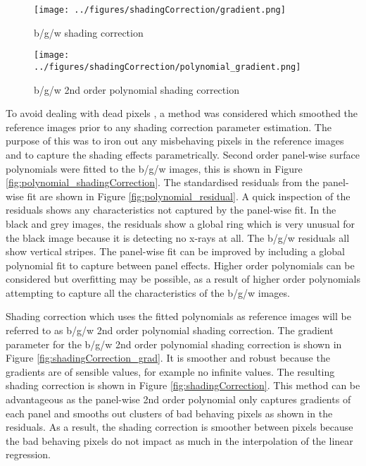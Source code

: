 \documentclass[a4paper]{proc}
\begin{document}
\begin{figure*}
	\centering
	\begin{subfigure}{0.45\textwidth}
		\texttt{[image: ../figures/shadingCorrection/gradient.png]}
		\caption{b/g/w shading correction}
	\end{subfigure}
	\begin{subfigure}{0.45\textwidth}
		\texttt{[image: ../figures/shadingCorrection/polynomial\_gradient.png]}
		\caption{b/g/w 2nd order polynomial shading correction}
	\end{subfigure}
	\caption{The gradient used in b/g/w shading correction. Red circles indicate infinite gradient, green circles indicate negative gradient.}
	\label{fig:shadingCorrection_grad}
\end{figure*}

To avoid dealing with dead pixels \cite{brettschneider2014spatial}, a method was considered which smoothed the reference images prior to any shading correction parameter estimation. The purpose of this was to iron out any misbehaving pixels in the reference images and to capture the shading effects parametrically. Second order panel-wise surface polynomials were fitted to the b/g/w images, this is shown in Figure \ref{fig:polynomial_shadingCorrection}. The standardised residuals from the panel-wise fit are shown in Figure \ref{fig:polynomial_residual}. A quick inspection of the residuals shows any characteristics not captured by the panel-wise fit. In the black and grey images, the residuals show a global ring which is very unusual for the black image because it is detecting no x-rays at all. The b/g/w residuals all show vertical stripes. The panel-wise fit can be improved by including a global polynomial fit to capture between panel effects. Higher order polynomials can be considered but overfitting may be possible, as a result of higher order polynomials attempting to capture all the characteristics of the b/g/w images.

Shading correction which uses the fitted polynomials as reference images will be referred to as b/g/w 2nd order polynomial shading correction. The gradient parameter for the b/g/w 2nd order polynomial shading correction is shown in Figure \ref{fig:shadingCorrection_grad}. It is smoother and robust because the gradients are of sensible values, for example no infinite values. The resulting shading correction is shown in Figure \ref{fig:shadingCorrection}. This method can be advantageous as the panel-wise 2nd order polynomial only captures gradients of each panel and  smooths out clusters of bad behaving pixels as shown in the residuals. As a result, the shading correction is smoother between pixels because the bad behaving pixels do not impact as much in the interpolation of the linear regression.
\end{document}
